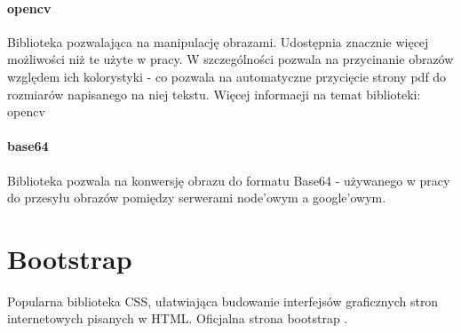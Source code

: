 \paragraph{opencv} Biblioteka pozwalająca na manipulację obrazami. Udostępnia znacznie więcej możliwości niż te użyte w pracy. W szczególności pozwala na przycinanie obrazów względem ich kolorystyki - co pozwala na automatyczne przycięcie strony pdf do rozmiarów napisanego na niej tekstu. Więcej informacji na temat biblioteki: opencv \cite{opencv}
\paragraph{base64} Biblioteka pozwala na konwersję obrazu do formatu Base64 - używanego w pracy do przesyłu obrazów pomiędzy serwerami node'owym a google'owym. 

\section{Bootstrap}  
Popularna biblioteka CSS, ułatwiająca budowanie interfejsów graficznych stron internetowych pisanych w HTML. Oficjalna strona bootstrap \cite{bootstrap}.




